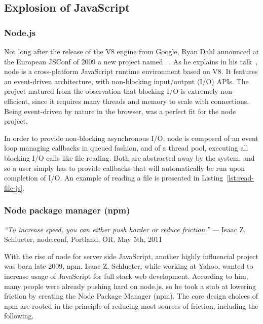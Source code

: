 \subsection{Explosion of JavaScript}%
\label{sub:explosion_of_javascript}


\subsubsection{Node.js}%
\label{ssub:node_js}

Not long after the release of the V8 engine from Google,
Ryan Dahl announced at the European JSConf of 2009
a new project named ~\cite{node-js-speaker}.
As he explains in his talk~\cite{node-js-video},
node is a cross-platform JavaScript runtime environment based on V8.
It features an event-driven architecture, with non-blocking input/output (I/O) APIs.
The project matured from the observation that blocking I/O is extremely non-efficient,
since it requires many threads and  memory to scale with connections.
 Being event-driven by nature in the browser,
 was a perfect fit for the node project.

In order to provide non-blocking asynchronous I/O,
node is composed of an event loop managing callbacks in queued fashion,
and of a thread pool, executing all blocking I/O calls like file reading.
Both are abstracted away by the system, and so a user simply has
to provide callbacks that will automatically be run upon completion of I/O.
An example of reading a file is presented in Listing~\ref{lst:read-file-js}.




\subsubsection{Node package manager (npm)}%
\label{ssub:node_package_manager_npm_}

\begin{displayquote}
	\textit{``To increase speed, you can either push harder or reduce friction.''}
	--- Isaac Z. Schlueter, node.conf, Portland, OR, May 5th, 2011
\end{displayquote}

With the rise of node for server side JavaScript,
another highly influencial project was born late 2009, npm.
Isaac Z. Schlueter, while working at Yahoo, wanted to increase usage
of JavaScript for full stack web development.
According to him, many people were already pushing hard on node.js,
so he took a stab at lowering friction by creating the Node Package Manager (npm).
The core design choices of npm are rooted in the principle of reducing
most sources of friction, including the following.

